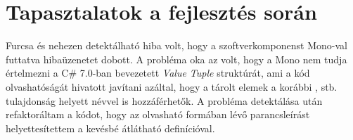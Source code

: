 \section{Tapasztalatok a fejlesztés során}

Furcsa és nehezen detektálható hiba volt, hogy a szoftverkomponenst Mono-val futtatva  hibaüzenetet dobott. A probléma oka az volt, hogy a Mono nem tudja értelmezni a C\# 7.0-ban bevezetett \textit{Value Tuple} struktúrát, ami a kód olvashatóságát hivatott javítani azáltal, hogy a tárolt elemek a korábbi ,  stb. tulajdonság helyett névvel is hozzáférhetők. A probléma detektálása után refaktoráltam a kódot, hogy az olvasható  formában lévő parancsleírást helyettesítettem a kevésbé átlátható  definícióval. \\